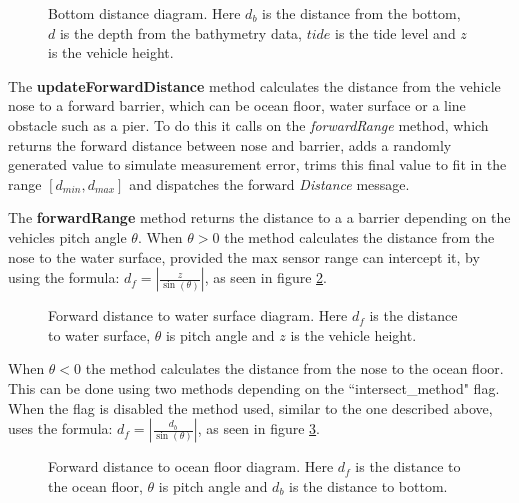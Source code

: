 \documentclass[10pt,a4paper]{article}
\begin{document}
\begin{figure}[h]
  \centering
  	
  \caption{Bottom distance diagram. Here $d_b$ is the distance from the bottom, $d$ is the depth from the bathymetry data, $tide$ is the tide level and $z$ is the vehicle height.}
  \label{bottom_distance_diagram}
\end{figure}

\par The \textbf{updateForwardDistance} method calculates the distance from the vehicle nose to a forward barrier, which can be ocean floor, water surface or a line obstacle such as a pier. To do this it calls on the \textit{forwardRange} method, which returns the forward distance between nose and barrier, adds a randomly generated value to simulate measurement error, trims this final value to fit in the range $\left[d_{min}, d_{max}\right]$ and dispatches the forward \textit{Distance} message. 

\par The \textbf{forwardRange} method returns the distance to a a barrier depending on the vehicles pitch angle $\theta$. When $\theta > 0$ the method calculates the distance from the nose to the water surface, provided the max sensor range can intercept it, by using the formula: $d_f = \left| \frac{z}{\sin \left( \theta \right)} \right|$, as seen in figure \ref{forward_distance_surface}.

\begin{figure}[h]
  \centering
  	
  \caption{Forward distance to water surface diagram. Here $d_f$ is the distance to water surface, $\theta$ is pitch angle and $z$ is the vehicle height.}
  \label{forward_distance_surface}
\end{figure}

When $\theta < 0$  the method calculates the distance from the nose to the ocean floor. This can be done using two methods depending on the ``intersect\_method" flag. When the flag is disabled the method used, similar to the one described above, uses the formula: $d_f = \left| \frac{d_b}{\sin \left( \theta \right)} \right|$, as seen in figure \ref{forward_distance_floor_simple}.

\begin{figure}[h]
  \centering
  	
  \caption{Forward distance to ocean floor diagram. Here $d_f$ is the distance to the ocean floor, $\theta$ is pitch angle and $d_b$ is the distance to bottom.}
  \label{forward_distance_floor_simple}
\end{figure}
\end{document}
